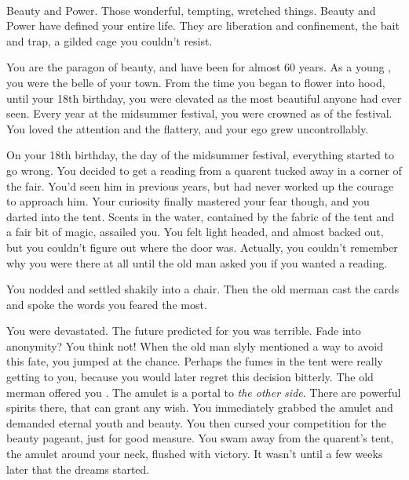\documentclass[char]{NeptuneBall}
\begin{document}
\name{\cWitch{}}



\\

Beauty and Power. Those wonderful, tempting, wretched things. Beauty and Power have defined your entire life. They are liberation and confinement, the bait and trap, a gilded cage you couldn't resist.

You are the paragon of beauty, and have been for almost 60 years. As a young \cWitch{\mer}, you were the belle of your town. From the time you began to flower into \cWitch{\human}hood, until your 18th birthday, you were elevated as the most beautiful \cWitch{\mer} anyone had ever seen. Every year at the midsummer festival, you were crowned as \cWitch{\King} of the festival. You loved the attention and the flattery, and your ego grew uncontrollably.

On your 18th birthday, the day of the midsummer festival, everything started to go wrong. You decided to get a reading from a quarent tucked away in a corner of the fair. You'd seen him in previous years, but had never worked up the courage to approach him. Your curiosity finally mastered your fear though, and you darted into the tent. Scents in the water, contained by the fabric of the tent and a fair bit of magic, assailed you. You felt light headed, and almost backed out, but you couldn't figure out where the door was. Actually, you couldn't remember why you were there at all until the old man asked you if you wanted a reading.

You nodded and settled shakily into a chair. Then the old merman cast the cards and spoke the words you feared the most.

You were devastated. The future predicted for you was terrible. Fade into anonymity? You think not! When the old man slyly mentioned a way to avoid this fate, you jumped at the chance. Perhaps the fumes in the tent were really getting to you, because you would later regret this decision bitterly. The old merman offered you \iAmulet{\MYname}. The amulet is a portal to \emph{the other side}. There are powerful spirits there, that can grant any wish. You immediately grabbed the amulet and demanded eternal youth and beauty. You then cursed your competition for the beauty pageant, just for good measure. You swam away from the quarent's tent, the amulet around your neck, flushed with victory. It wasn't until a few weeks later that the dreams started.
\end{document}

